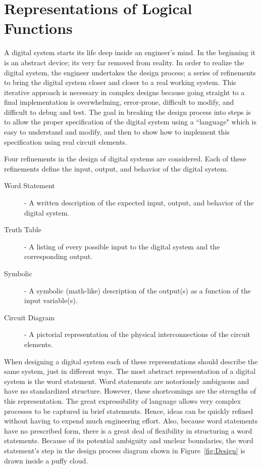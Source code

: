 \chapter{Representations of Logical Functions}
A digital system starts its life deep inside an engineer's mind.  
In the beginning it is an abstract device; its very far removed 
from reality.  In order to realize the digital system, the engineer
undertakes the design process; a series of refinements to bring
the digital system closer and closer to a real working system.  This 
iterative approach is necessary in complex designs because going straight
to a final implementation is overwhelming, error-prone, difficult
to modify, and difficult to debug and test.  The goal in breaking the 
design process into steps is to allow the proper specification of the
digital system using a ``language" which is easy to understand and modify,
and then to show how to implement this specification using real circuit 
elements. 

Four refinements in the design of digital systems are 
considered.  Each of these refinements define the input, output, and 
behavior of the digital system.  

\begin{description}
\item [Word Statement] - A written description of the expected 
	input, output, and behavior of the digital system.
\item [Truth Table] -  A listing of every possible input to the
	digital system and the corresponding output.  
\item [Symbolic] - A symbolic (math-like) description of the 
	output(s) as a function of the input variable(s).
\item [Circuit Diagram] - A pictorial representation of the 
	physical interconnections of the circuit elements.
\end{description}

When designing a digital system each of these representations should
describe the same system, just in different ways.  The most abstract 
representation of a digital system is the word statement.  Word 
statements are notoriously ambiguous and have no standardized structure.  
However, these shortcomings are the strengths of this representation. The great
expressibility of language allows very complex processes to be captured 
in brief statements.  Hence, ideas can be quickly refined 
without having to expend much engineering effort.  Also, because 
word statements have no prescribed form, there is a great deal 
of flexibility in structuring a word statements.  Because of its
potential ambiguity and unclear boundaries, the word statement's step 
in the design process diagram shown in Figure~\ref{fig:Design} is 
drawn inside a puffy cloud.

